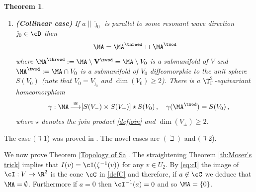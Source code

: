\documentclass[11pt,a4paper,reqno]{article}
\DeclareMathOperator*{\toup}{\longrightarrow}
\numberwithin{equation}{section}
\newtheorem{theorem}{Theorem}[section]
\newtheorem{lemma}[theorem]{Lemma}
\theoremstyle{definition}
\begin{document}
\begin{theorem}
\begin{itemize}
\begin{enumerate}
            \item[$(\daleth$2) ] {\bf (Collinear case)} If $a 
             \parallel \hat \jmath_0 $ is parallel to some resonant wave direction $ \hat \jmath_0 \in \cD $ then  
            \begin{equation}\label{Sa3dSa2d}
                           \MA =  \MA^{\threed} \, \sqcup  \, \MA^{\twod} 
\end{equation}
where  
$ \MA^{\threed}:=
 \MA\setminus {\bf V}^{\twod} = \MA\setminus V_0 $ is a submanifold of $ V $ and 
    $ \MA^{\twod}:=\MA\cap V_0
            $ is a submanifold of $ 
                V_0 $  diffeomorphic to the unit sphere    $ S(V_0)$  
(note that $V_0=V_{\hat \jmath_0}$ and $ \dim (V_0) \geq 2 $). There is a $\T^2_{\Gamma}$-equivariant homeomorphism           \begin{equation}\label{gamma homeomorphism}
         \quad            \gamma:\MA\toup^{\cong}
                    [S(V_-)\times S(V_+)] \star S(V_0)\, ,
                    \quad \gamma(\MA^{\twod})=S(V_0) \, , 
                \end{equation}
                where $\star$ denotes the {\sc join product} \eqref{defjoin} and $\dim(V_\pm ) \geq 2 $.
            \end{enumerate} 
    \end{itemize}
\end{theorem}

    The case $(\daleth$1) was  proved in \cite{CN}. The novel cases  are $(\beth) $ and $(\daleth$2). 

    We now prove  
    Theorem \ref{Topology of Sa}.
     The straightening Theorem \ref{th:Moser's trick}  implies that $I(v)=\cI ( \zeta^{-1}(v))  
 $ for any $v\in U_2$. 
    By \eqref{eq:cI} the image of $ \cI : V \to \R^2 $ is the cone  $\cC$  in \eqref{defC}
    and therefore, if $a\not \in \cC$ we deduce that   $ \MA=\emptyset$.
    Furthermore 
    if $a=0$ then $ \cI^{-1} (a) = 0 $ and so 
    $\MA=\{0\}$. 


\end{document}
